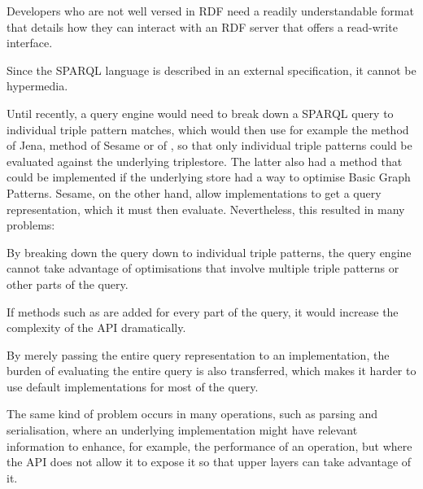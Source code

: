 \begin{problem}\label{prob:lapis}
Developers who are not well versed in RDF need a readily
understandable format that details how they can interact with an RDF
server that offers a read-write interface.
\end{problem}

\begin{problem}\label{prob:tpf}
Since the SPARQL language is described in an external specification,
it cannot be hypermedia.
\end{problem}

Until recently, a query engine would need to break down a SPARQL query
to individual triple pattern matches, which would then use for example
the  method of Jena,  method
of Sesame or  of , so that only
individual triple patterns could be evaluated against the underlying
triplestore.  The latter also had a  method that
could be implemented if the underlying store had a way to optimise
Basic Graph Patterns. Sesame, on the other hand, allow implementations
to get a query representation, which it must then evaluate.
Nevertheless, this resulted in many problems:

\begin{problem}\label{prob:breakdown}
By breaking down the query down to individual triple patterns, the
query engine cannot take advantage of optimisations that involve
multiple triple patterns or other parts of the query.
\end{problem}

\begin{problem}\label{prob:complexapi}
If methods such as  are added for every part of the
query, it would increase the complexity of the API dramatically.
\end{problem}

\begin{problem}\label{prob:dontjustpass}
By merely passing the entire query representation to an
implementation, the burden of evaluating the entire query is also
transferred, which makes it harder to use default implementations for
most of the query.
\end{problem}

The same kind of problem occurs in many operations, such as parsing
and serialisation, where an underlying implementation might have
relevant information to enhance, for example, the performance of an operation,
but where the API does not allow it to expose it so that upper layers
can take advantage of it.

